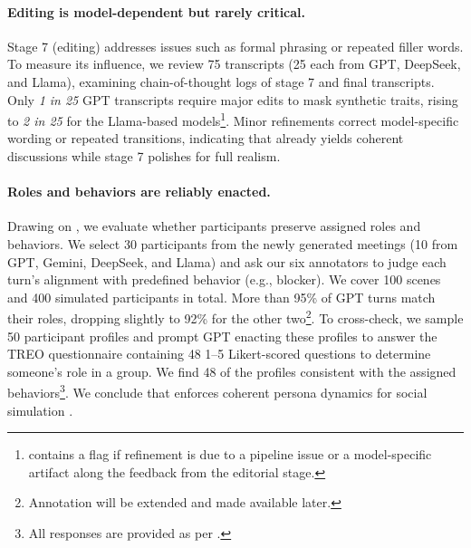 \paragraph{Editing is model-dependent but rarely critical.}
Stage 7 (editing) addresses issues such as formal phrasing or repeated filler words.
To measure its influence, we review 75 transcripts (25 each from GPT, DeepSeek, and Llama), examining chain-of-thought logs of stage 7 and final transcripts.
Only \emph{1 in 25} GPT transcripts require major edits to mask synthetic traits, rising to \emph{2 in 25} for the Llama-based models\footnote{\dataset{} contains a flag if refinement is due to a pipeline issue or a model-specific artifact along the feedback from the editorial stage.}. 
Minor refinements correct model-specific wording or repeated transitions, indicating that \pipeline{} already yields coherent discussions while stage 7 polishes for full realism.




\paragraph{Roles and behaviors are reliably enacted.}
Drawing on \citet{SerapioGarciaSCS23a}, we evaluate whether participants preserve assigned roles and behaviors.
We select 30 participants from the newly generated meetings (10 from GPT, Gemini, DeepSeek, and Llama) and ask our six annotators to judge each turn’s alignment with predefined behavior (e.g., blocker).
We cover 100 scenes and 400 simulated participants in total.
More than 95\% of GPT turns match their roles, dropping slightly to 92\% for the other two\footnote{Annotation will be extended and made available later.}.
To cross-check, we sample 50 participant profiles and prompt GPT enacting these profiles to answer the TREO questionnaire \cite{MathieuTKD15} containing 48 1--5 Likert-scored questions to determine someone's role in a group.
We find 48 of the profiles consistent with the assigned behaviors\footnote{All responses are provided as per .}.
We conclude that \pipeline{} enforces coherent persona dynamics for social simulation \cite{ZhouZMZ24}.
